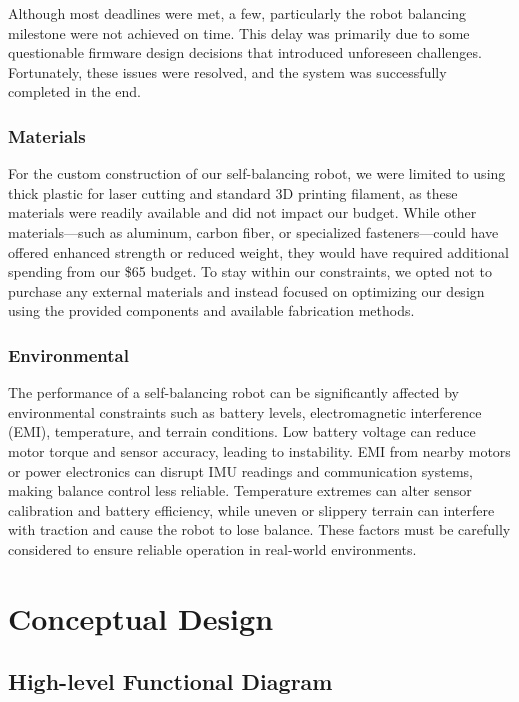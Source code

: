 \documentclass{article}
\begin{document}
Although most deadlines were met, a few, particularly the robot balancing milestone were not achieved on time. This delay was primarily due to some questionable firmware design decisions that introduced unforeseen challenges. Fortunately, these issues were resolved, and the system was successfully completed in the end.


\subsubsection{Materials}
For the custom construction of our self-balancing robot, we were limited to using thick plastic for laser cutting and standard 3D printing filament, as these materials were readily available and did not impact our budget. While other materials—such as aluminum, carbon fiber, or specialized fasteners—could have offered enhanced strength or reduced weight, they would have required additional spending from our \$65 budget. To stay within our constraints, we opted not to purchase any external materials and instead focused on optimizing our design using the provided components and available fabrication methods.

\subsubsection{Environmental}
The performance of a self-balancing robot can be significantly affected by environmental constraints such as battery levels, electromagnetic interference (EMI), temperature, and terrain conditions. Low battery voltage can reduce motor torque and sensor accuracy, leading to instability. EMI from nearby motors or power electronics can disrupt IMU readings and communication systems, making balance control less reliable. Temperature extremes can alter sensor calibration and battery efficiency, while uneven or slippery terrain can interfere with traction and cause the robot to lose balance. These factors must be carefully considered to ensure reliable operation in real-world environments.

\section{Conceptual Design}

\subsection{High-level Functional Diagram}
\end{document}
